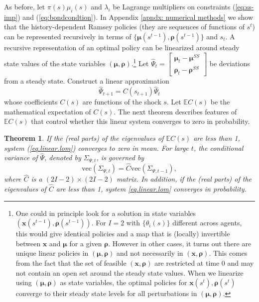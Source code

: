 \documentclass[thmsb,11pt]{article}
\newtheorem{theorem}{Theorem}
\newcommand{\bmat}{\begin{matrix}}
\newcommand{\emat}{\end{matrix}}
\begin{document}
As before, let $\pi(s)\mu_i(s)$ and $\lambda_i$ be Lagrange multipliers on constraints (\ref{eq:ss-imp}) and (\ref{eq:bondcondtion}).
In Appendix \ref{apndx: numerical methods} we show that the history-dependent Ramsey policies
(they are sequences of functions of $s^t$) can be represented  recursively in terms of $\{\bm \mu(s^{t-1}),\bm \rho(s^{t-1})\}$ and $s_t$.
A recursive representation of an optimal policy can be linearized around  steady state values of the state
variables  $(\bm{\mu},\bm{\rho})$.\footnote{One could  in principle look for a solution in state variables $\left(\bm{x}(s^{t-1}),\bm{\rho}(s^{t-1})\right)$.
For $I=2$ with $\{\theta_i(s)\}$ different across agents, this would give identical policies and a map that is (locally) invertible between $\bm{x}$ and $\bm{\mu}$ for
a given $\bm{\rho}$. However in other cases, it turns out there are unique linear policies in $(\bm{\mu},\bm{\rho}
)$ and not necessarily in  $(\bm{x},\bm{\rho})$. This comes from the fact that the set of feasible $(\bm{x},\bm{\rho})$ are restricted at time 0 and may not contain an open set around the steady state values. When we linearize using $(\bm{\mu},\bm{\rho})$ as state variables, the optimal policies for $\bm{x}(s^t),\bm{\rho}(s^t)$ converge to their  steady state levels for all perturbations in $(\bm{\mu},\bm{\rho})$.}
Let $\hat{\Psi}_{t}= \left[\bmat \bm{\mu}_{t} - \bm{\mu}^{SS}\\ \bm \rho_t - \bm \rho^{SS}\emat\right]$ be  deviations from a steady state.
Construct a  linear approximation
\begin{equation}
 \hat{\Psi}_{t+1}=C(s_{t+1})\hat{\Psi}_t \label{eq.linear.lom}
\end{equation}
whose coefficients $C(s)$   are functions of the shock $s$. Let $\mathbb{E}C(s)$  be the mathematical expectation of  $C(s)$. The next theorem describes features of $\mathbb{E}C(s)$ that control whether  this linear system converges to zero in probability.

\begin{theorem}\label{thm: localstability}
If the (real parts) of the eigenvalues of $\mathbb{E}C(s)$ are less than 1,  system (\ref{eq.linear.lom}) converges to zero  in mean.
For large $t$, the conditional variance of $\hat{\Psi}$, denoted by $\Sigma_{\Psi,t}$, is governed by
\[\text{vec}(\Sigma_{\Psi,t})=\hat{C} \text{vec}(\Sigma_{\Psi,t-1}),\]	
where $\hat{C}$ is a $(2I-2) \times (2I-2)$ matrix. In addition,  if the (real parts) of the eigenvalues of $\hat{C}$ are less than 1, system \eqref{eq.linear.lom}
converges in probability.
\end{theorem}
\end{document}

